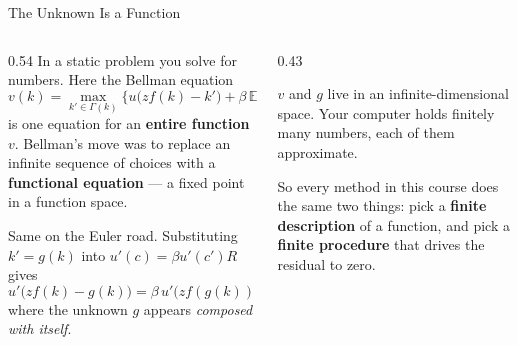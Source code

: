 \begin{frame}{The Unknown Is a Function}
\begin{columns}[T]
\begin{column}{0.54\textwidth}
\small
In a static problem you solve for numbers. Here the Bellman equation
\[
  v(k) = \max_{k'\in\Gamma(k)}\big\{u\big(zf(k)-k'\big) + \beta\,\mathbb{E}\,v(k')\big\}
\]
is one equation for an \textbf{entire function} $v$. Bellman's move was to replace an infinite sequence of choices with a \textbf{functional equation} --- a fixed point in a function space.
\medskip

Same on the Euler road. Substituting $k'=g(k)$ into $u'(c)=\beta u'(c')R$ gives
\[
  u'\big(zf(k)-g(k)\big)=\beta\,u'\big(zf(g(k))-g(g(k))\big)R\big(g(k)\big),
\]
where the unknown $g$ appears \emph{composed with itself}.
\end{column}
\begin{column}{0.43\textwidth}
\begin{conceptbox}[title=\textbf{The gap, stated once}]\small
$v$ and $g$ live in an infinite-dimensional space. Your computer holds finitely many numbers, each of them approximate.
\end{conceptbox}
\medskip
\begin{examplebox}\footnotesize
So every method in this course does the same two things: pick a \textbf{finite description} of a function, and pick a \textbf{finite procedure} that drives the residual to zero.
\end{examplebox}
\vspace{1mm}
\end{column}
\end{columns}
\end{frame}

